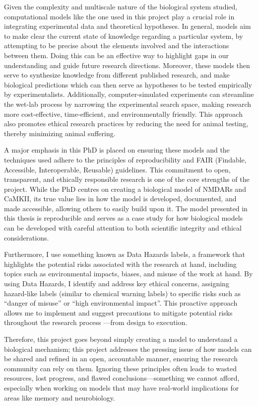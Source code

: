 \documentclass[
  11pt,
  letterpaper,
]{scrreprt}
\begin{document}
Given the complexity and multiscale nature of the biological system
studied, computational models like the one used in this project play a
crucial role in integrating experimental data and theoretical
hypotheses. In general, models aim to make clear the current state of
knowledge regarding a particular system, by attempting to be precise
about the elements involved and the interactions between them. Doing
this can be an effective way to highlight gaps in our understanding and
guide future research directions. Moreover, these models then serve to
synthesize knowledge from different published research, and make
biological predictions which can then serve as hypotheses to be tested
empirically by experimentalists. Additionally, computer-simulated
experiments can streamline the wet-lab process by narrowing the
experimental search space, making research more cost-effective,
time-efficient, and environmentally friendly. This approach also
promotes ethical research practices by reducing the need for animal
testing, thereby minimizing animal suffering.

A major emphasis in this PhD is placed on ensuring these models and the
techniques used adhere to the principles of reproducibility and FAIR
(Findable, Accessible, Interoperable, Reusable) guidelines. This
commitment to open, transparent, and ethically responsible research is
one of the core strengths of the project. While the PhD centres on
creating a biological model of NMDARs and CaMKII, its true value lies in
how the model is developed, documented, and made accessible, allowing
others to easily build upon it. The model presented in this thesis is
reproducible and serves as a case study for how biological models can be
developed with careful attention to both scientific integrity and
ethical considerations.

Furthermore, I use something known as Data Hazards labels, a framework
that highlights the potential risks associated with the research at
hand, including topics such as environmental impacts, biases, and misuse
of the work at hand. By using Data Hazards, I identify and address key
ethical concerns, assigning hazard-like labels (similar to chemical
warning labels) to specific risks such as ``danger of misuse'' or ``high
environmental impact''. This proactive approach allows me to implement
and suggest precautions to mitigate potential risks throughout the
research process ---from design to execution.

Therefore, this project goes beyond simply creating a model to
understand a biological mechanism; this project addresses the pressing
issue of how models can be shared and refined in an open, accountable
manner, ensuring the research community can rely on them. Ignoring these
principles often leads to wasted resources, lost progress, and flawed
conclusions---something we cannot afford, especially when working on
models that may have real-world implications for areas like memory and
neurobiology.
\end{document}
